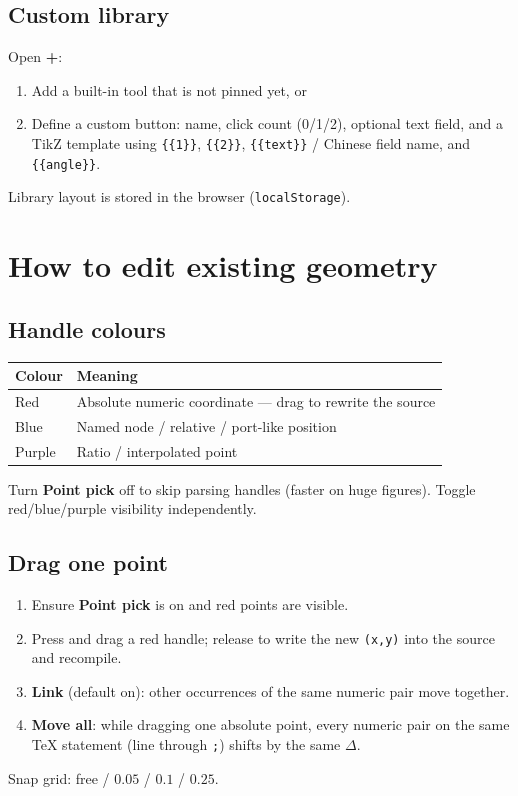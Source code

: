 \documentclass[a4paper]{ltxdoc}
\newcommand{\ui}[1]{\textbf{#1}}
\begin{document}
\subsection{Custom library}
Open \ui{+}:
\begin{enumerate}[nosep]
  \item Add a built-in tool that is not pinned yet, or
  \item Define a custom button: name, click count (0/1/2), optional text
        field, and a TikZ template using
        \texttt{\{\{1\}\}}, \texttt{\{\{2\}\}},
        \texttt{\{\{text\}\}} / Chinese field name, and
        \texttt{\{\{angle\}\}}.
\end{enumerate}
Library layout is stored in the browser (\texttt{localStorage}).

\section{How to edit existing geometry}
\label{sec:edit}

\subsection{Handle colours}
\begin{center}
\begin{tabular}{@{}ll@{}}
\toprule
Colour & Meaning \\
\midrule
Red & Absolute numeric coordinate --- drag to rewrite the source \\
Blue & Named node / relative / port-like position \\
Purple & Ratio / interpolated point \\
\bottomrule
\end{tabular}
\end{center}

Turn \ui{Point pick} off to skip parsing handles (faster on huge figures).
Toggle red/blue/purple visibility independently.

\subsection{Drag one point}
\begin{enumerate}[nosep]
  \item Ensure \ui{Point pick} is on and red points are visible.
  \item Press and drag a red handle; release to write the new
        \texttt{(x,y)} into the source and recompile.
  \item \ui{Link} (default on): other occurrences of the same numeric pair
        move together.
  \item \ui{Move all}: while dragging one absolute point, every numeric
        pair on the same TeX statement (line through \texttt{;}) shifts
        by the same $\Delta$.
\end{enumerate}
Snap grid: free / $0.05$ / $0.1$ / $0.25$.
\end{document}
